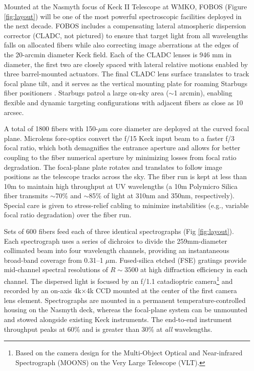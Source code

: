 Mounted at the Nasmyth focus of Keck II Telescope at WMKO, FOBOS
(Figure \ref{fig:layout}) will be one of the most powerful
spectroscopic facilities deployed in the next decade. FOBOS includes
a compensating lateral atmospheric dispersion corrector (CLADC, not
pictured) to ensure that target light from all wavelengths falls on
allocated fibers while also correcting image aberrations at the edges
of the 20-arcmin diameter Keck field. Each of the CLADC lenses is 946
mm in diameter, the first two are closely spaced with lateral
relative motions enabled by three barrel-mounted actuators. The final
CLADC lens surface translates to track focal plane tilt, and it
serves as the vertical mounting plate for roaming Starbugs fiber
positioners . Starbugs patrol a large on-sky area
($\sim$1 arcmin), enabling flexible and dynamic targeting
configurations with adjacent fibers as close as 10 arcsec.


A total of 1800 fibers with 150-$\mu$m core diameter are deployed at
the curved focal plane. Microlens fore-optics convert the f/15 Keck
input beam to a faster f/3 focal ratio, which both demagnifies the
entrance aperture and allows for better coupling to the fiber
numerical aperture by minimizing losses from focal ratio degradation.
The focal-plane plate rotates and translates to follow image
positions as the telescope tracks across the sky. The fiber run is
kept at less than 10m to maintain high throughput at UV wavelengths
(a 10m Polymicro Silica fiber transmits $\sim$70\% and $\sim$85\% of
light at 310nm and 350nm, respectively). Special care is given to
stress-relief cabling to minimize instabilities (e.g., variable focal
ratio degradation) over the fiber run.

Sets of 600 fibers feed each of three identical spectrographs (Fig
\ref{fig:layout}). Each spectrograph uses a series of dichroics to
divide the 259mm-diameter collimated beam into four wavelength
channels, providing an instantaneous broad-band coverage from 0.31--1
$\mu$m. Fused-silica etched (FSE) gratings provide mid-channel
spectral resolutions of $R \sim 3500$ at high diffraction efficiency
in each channel. The dispersed light is focused by an f/1.1
catadioptric camera\footnote{Based on the camera design for the
Multi-Object Optical and Near-infrared Spectrograph (MOONS) on the
Very Large Telescope (VLT).} and recorded by an on-axis 4k$\times$4k
CCD mounted at the center of the first camera lens element.
Spectrographs are mounted in a permanent temperature-controlled
housing on the Nasmyth deck, whereas the focal-plane system can be
unmounted and stowed alongside existing Keck instruments. The
end-to-end instrument throughput peaks at 60\% and is greater than
30\% at {\it all} wavelengths.

